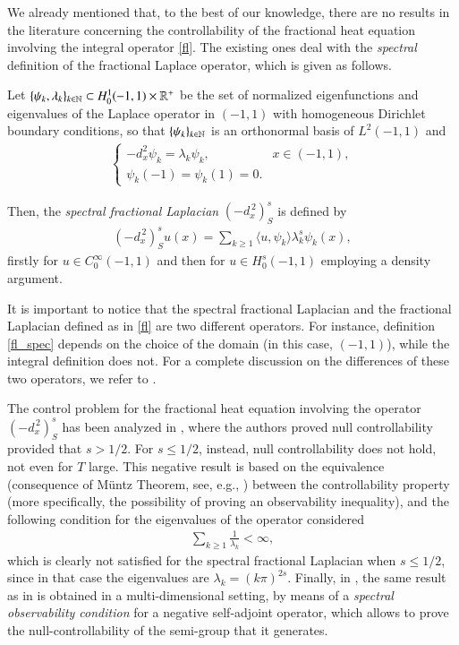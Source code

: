We already mentioned that, to the best of our knowledge, there are no results in the literature concerning the controllability of the fractional heat equation involving the integral operator \eqref{fl}. The existing ones deal with the \textit{spectral} definition of the fractional Laplace operator, which is given as follows.

Let $\{\psi_k,\lambda_k\}_{k\in\mathbb{N}}\subset H_0^1(-1,1)\times\mathbb{R}^+$ be the set of normalized eigenfunctions and eigenvalues of the Laplace operator in $(-1,1)$ with homogeneous Dirichlet boundary conditions, so that $\{\psi_k\}_{k\in\mathbb{N}}$ is an orthonormal basis of $L^2(-1,1)$ and         
\begin{align*}
	\begin{cases}
		-d_x^2\psi_k =\lambda_k\psi_k, & x\in (-1,1), 
		\\
		\psi_k(-1)=\psi_k(1)=0.
	\end{cases}
\end{align*}

Then, the \textit{spectral fractional Laplacian} $(-d_x^{\,2})^s_S$ is defined by
\begin{align}\label{fl_spec}
	(-d_x^{\,2})^s_S u(x) = \sum_{k\geq 1}\langle u,\psi_k\rangle \lambda_k^s\psi_k(x),
\end{align}
firstly for $u\in C_0^{\infty}(-1,1)$ and then for $u\in H_0^s(-1,1)$ employing a density argument.

It is important to notice that the spectral fractional Laplacian and the fractional Laplacian defined as in \eqref{fl} are two different operators. For instance, definition \eqref{fl_spec} depends on the choice of the domain (in this case, $(-1,1)$), while the integral definition does not. For a complete discussion on the differences of these two operators, we refer to \cite{servadei2014spectrum}.

The control problem for the fractional heat equation involving the operator $(-d_x^{\,2})^s_S$ has been analyzed in \cite{micu2006controllability}, where the authors proved null controllability provided that $s>1/2$. For $s\leq 1/2$, instead, null controllability does not hold, not even for $T$ large. This negative result is based on the equivalence (consequence of M\"untz Theorem, see, e.g., \cite[Page 24]{schwartz1958etude}) between the controllability property (more specifically, the possibility of proving an observability inequality), and the following condition for the eigenvalues of the operator considered
\begin{align}\label{eigen_cond}
	\sum_{k\geq 1} \frac{1}{\lambda_k}<\infty,
\end{align} 
which is clearly not satisfied for the spectral fractional Laplacian when $s\leq 1/2$, since in that case the eigenvalues are $\lambda_k = (k\pi)^{2s}$. Finally, in \cite{miller2006controllability}, the same result as in \cite{micu2006controllability} is obtained in a multi-dimensional setting, by means of a  \textit{spectral observability condition} for a negative self-adjoint operator, which allows to prove the null-controllability of the semi-group that it generates.

